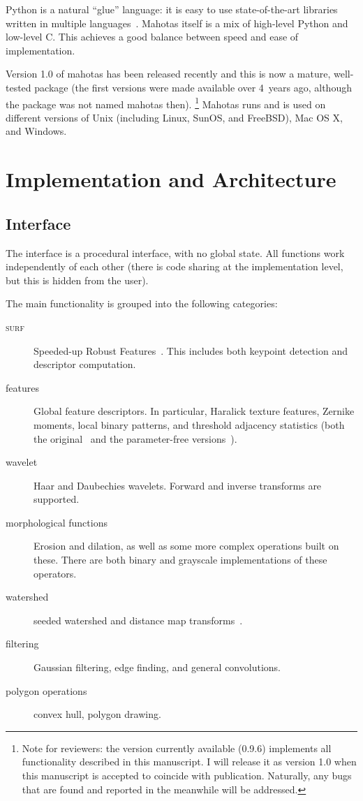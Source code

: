 \documentclass{scrartcl}
\newcommand*{\cpp}{{C\nolinebreak[4]\hspace{-.05em}\raisebox{.4ex}{\tiny\textbf{++}}}}
\begin{document}
Python is a natural ``glue'' language: it is easy to use state-of-the-art
libraries written in multiple languages~\citep{10.1109/MCSE.2007.58}. Mahotas
itself is a mix of high-level Python and low-level \cpp{}. This achieves a good
balance between speed and ease of implementation.

Version 1.0 of mahotas has been released recently and this is now a mature,
well-tested package (the first versions were made available over 4~years ago,
although the package was not named mahotas then). \footnote{Note for reviewers:
the version currently available (0.9.6) implements all functionality described
in this manuscript. I will release it as version 1.0 when this manuscript is
accepted to coincide with publication. Naturally, any bugs that are found and
reported in the meanwhile will be addressed.} Mahotas runs and is used on
different versions of Unix (including Linux, SunOS, and FreeBSD), Mac OS X, and
Windows.

\section{Implementation and Architecture}

\subsection{Interface}

The interface is a procedural interface, with no global state. All functions
work independently of each other (there is code sharing at the implementation
level, but this is hidden from the user).

The main functionality is grouped into the following categories:

\begin{description}
\item[\textsc{surf}] Speeded-up Robust Features~\citep{eth_biwi_00517}. This
includes both keypoint detection and descriptor computation.
\item[features] Global feature descriptors. In particular, Haralick texture
features, Zernike moments, local binary patterns, and threshold adjacency
statistics (both the original~\citep{Hamilton2007} and the parameter-free
versions~\citep{Coelho2010}).
\item[wavelet] Haar and Daubechies wavelets. Forward and inverse transforms are
supported.
\item[morphological functions] Erosion and dilation, as well as some more
complex operations built on these. There are both binary and grayscale
implementations of these operators.
\item[watershed] seeded watershed and distance map
transforms~\citep{felzenszwalb}.
\item[filtering] Gaussian filtering, edge finding, and general convolutions.
\item[polygon operations] convex hull, polygon drawing.
\end{description}
\end{document}
